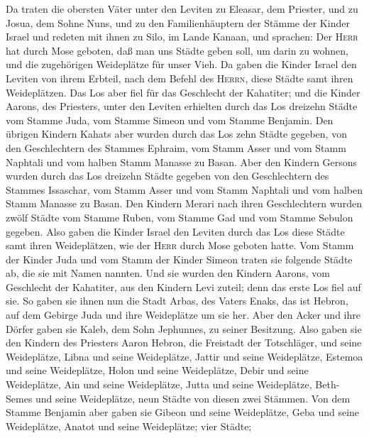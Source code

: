  Da traten die obersten Väter unter den Leviten zu
Eleasar, dem Priester, und zu Josua, dem Sohne Nuns, und zu den
Familienhäuptern der Stämme der Kinder Israel  und redeten
mit ihnen zu Silo, im Lande Kanaan, und sprachen: Der \textsc{Herr} hat
durch Mose geboten, daß man uns Städte geben soll, um darin zu wohnen,
und die zugehörigen Weideplätze für unser Vieh.  Da gaben
die Kinder Israel den Leviten von ihrem Erbteil, nach dem Befehl des
\textsc{Herrn}, diese Städte samt ihren Weideplätzen.  Das
Los aber fiel für das Geschlecht der Kahatiter; und die Kinder Aarons,
des Priesters, unter den Leviten erhielten durch das Los dreizehn Städte
vom Stamme Juda, vom Stamme Simeon und vom Stamme Benjamin.
 Den übrigen Kindern Kahats aber wurden durch das Los zehn
Städte gegeben, von den Geschlechtern des Stammes Ephraim, vom Stamm
Asser und vom Stamm Naphtali und vom halben Stamm Manasse zu Basan.
 Aber den Kindern Gersons wurden durch das Los dreizehn
Städte gegeben von den Geschlechtern des Stammes Issaschar, vom Stamm
Asser und vom Stamm Naphtali und vom halben Stamm Manasse zu Basan.
 Den Kindern Merari nach ihren Geschlechtern wurden zwölf
Städte vom Stamme Ruben, vom Stamme Gad und vom Stamme Sebulon gegeben.
 Also gaben die Kinder Israel den Leviten durch das Los
diese Städte samt ihren Weideplätzen, wie der \textsc{Herr} durch Mose
geboten hatte.  Vom Stamm der Kinder Juda und vom Stamm
der Kinder Simeon traten sie folgende Städte ab, die sie mit Namen
nannten.  Und sie wurden den Kindern Aarons, vom
Geschlecht der Kahatiter, aus den Kindern Levi zuteil; denn das erste
Los fiel auf sie.  So gaben sie ihnen nun die Stadt
Arbas, des Vaters Enaks, das ist Hebron, auf dem Gebirge Juda und ihre
Weideplätze um sie her.  Aber den Acker und ihre Dörfer
gaben sie Kaleb, dem Sohn Jephunnes, zu seiner Besitzung.
 Also gaben sie den Kindern des Priesters Aaron Hebron,
die Freistadt der Totschläger, und seine Weideplätze, Libna und seine
Weideplätze,  Jattir und seine Weideplätze, Estemoa und
seine Weideplätze,  Holon und seine Weideplätze,
 Debir und seine Weideplätze, Ain und seine Weideplätze,
Jutta und seine Weideplätze, Beth-Semes und seine Weideplätze, neun
Städte von diesen zwei Stämmen.  Von dem Stamme Benjamin
aber gaben sie Gibeon und seine Weideplätze, Geba und seine Weideplätze,
Anatot und seine Weideplätze;  vier Städte;
